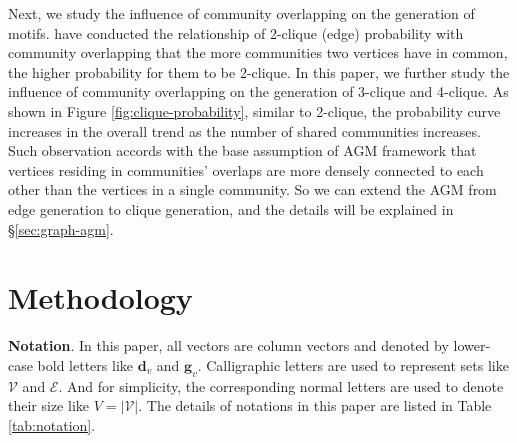 \documentclass[sigconf]{acmart}
\begin{document}
Next, we study the influence of community overlapping on the generation of motifs.
\citet{yang2013overlapping} have conducted the relationship of 2-clique (edge) probability with community overlapping that the more communities two vertices have in common, the higher probability for them to be 2-clique.
In this paper, we further study the influence of community overlapping on the generation of 3-clique and 4-clique.
As shown in Figure \ref{fig:clique-probability}, similar to 2-clique, the probability curve increases in the overall trend as the number of shared communities increases.
Such observation accords with the base assumption of AGM framework that vertices residing in communities' overlaps are more densely connected to each other than the vertices in a single community.
So we can extend the AGM from edge generation to clique generation, and the details will be explained in \S \ref{sec:graph-agm}.


\section{Methodology}

\textbf{Notation}. 
In this paper, all vectors are column vectors and denoted by lower-case bold letters like $\mathbf{d}_v$ and $\mathbf{g}_v$. 
Calligraphic letters are used to represent sets like $\mathcal{V}$ and $\mathcal{E}$. 
And for simplicity, the corresponding normal letters are used to denote their size like $V=|\mathcal{V}|$. 
The details of notations in this paper are listed in Table \ref{tab:notation}.
\end{document}
